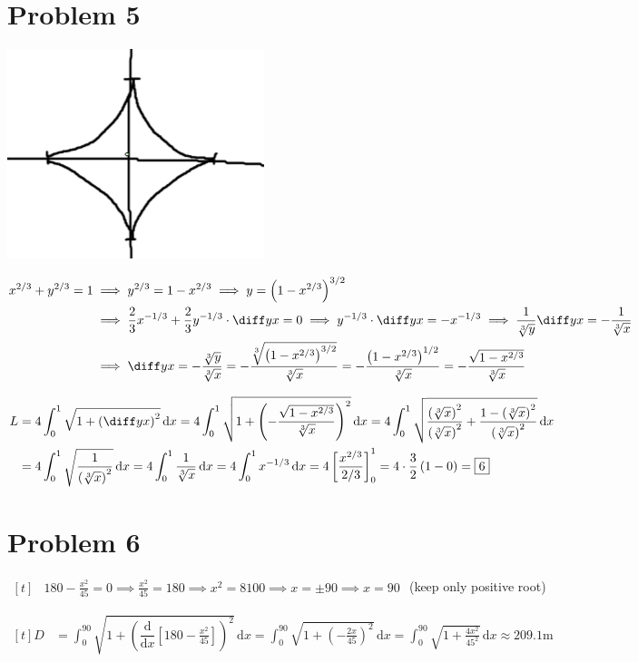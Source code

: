 \documentclass[preview, margin=0.6in]{standalone}
\newcommand*{\problem}[1]{\section*{Problem #1}}
\newcommand*{\deriv}[1][x]{\ensuremath{\dfrac{\mathrm{d}}{\mathrm{d}#1}}}
\begin{document}
\problem{5}
\begin{center}
	\includegraphics[width=0.4\linewidth]{p5.png}
\end{center}
$\begin{aligned}[t]
	x^{2/3}+y^{2/3}=1
	&\implies y^{2/3}=1-x^{2/3}
	\implies y=\left(1-x^{2/3}\right)^{3/2} \\
	&\implies \frac23 x^{-1/3}+\frac23 y^{-1/3}\cdot\diff yx=0
	\implies y^{-1/3}\cdot\diff yx=-x^{-1/3}
	\implies \frac{1}{\sqrt[3]{y}}\diff yx=-\frac{1}{\sqrt[3]{x}} \\
	&\implies \diff yx=-\frac{\sqrt[3]{y}}{\sqrt[3]{x}}
	=-\frac{\sqrt[3]{\left(1-x^{2/3}\right)^{3/2}}}{\sqrt[3]{x}}
	=-\frac{\left(1-x^{2/3}\right)^{1/2}}{\sqrt[3]{x}}
	=-\frac{\sqrt{1-x^{2/3}}}{\sqrt[3]{x}}
\end{aligned}$

$\begin{aligned}[t]
	L&=4 \int_{0}^{1}\sqrt{1+\left(\diff yx\right)^2}\,\mathrm{d}x
	 =4 \int_{0}^{1}\sqrt{1+\left(-\frac{\sqrt{1-x^{2/3}}}{\sqrt[3]{x}}\right)^2}\,\mathrm{d}x
	 =4 \int_{0}^{1}\sqrt{\frac{\left(\sqrt[3]{x}\right)^2}{\left(\sqrt[3]{x}\right)^2}+\frac{1- \left(\sqrt[3]{x}\right)^2}{\left(\sqrt[3]{x}\right)^2}}\,\mathrm{d}x \\
	 &=4 \int_{0}^{1}\sqrt{\frac{1}{\left(\sqrt[3]{x}\right)^2}}\,\mathrm{d}x
	 =4 \int_{0}^{1}\frac{1}{\sqrt[3]{x}}\,\mathrm{d}x
	 =4 \int_{0}^{1}x^{-1/3}\,\mathrm{d}x
	 =4 \left[\frac{x^{2/3}}{2/3}\right]_{0}^{1}
	 =4\cdot\frac32 \left(1-0\right)
	 =\boxed{6}
\end{aligned}$

\problem{6}
$\begin{aligned}[t]
	&180-\frac{x^2}{45}=0
	\implies \frac{x^2}{45}=180
	\implies x^2=8100
	\implies x=\pm90
	\implies x=90
\end{aligned}$
(keep only positive root)
\newline

$\begin{aligned}[t]
	D&=\int_{0}^{90}\sqrt{1+\left(\deriv[x]\left[180-\frac{x^2}{45}\right]\right)^2}\,\mathrm{d}x
	=\int_{0}^{90}\sqrt{1+\left(-\frac{2x}{45}\right)^2}\,\mathrm{d}x
	=\int_{0}^{90}\sqrt{1+\frac{4x^2}{45^2}}\,\mathrm{d}x
	\approx \boxed{209.1\si{\meter}}
\end{aligned}$
\end{document}
